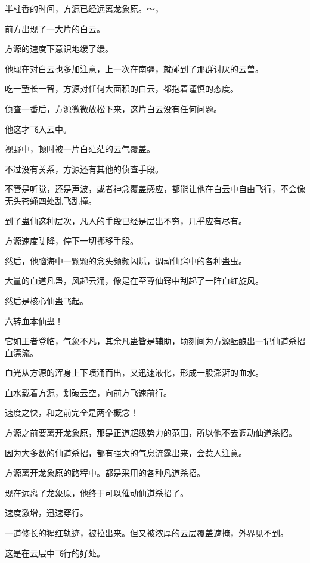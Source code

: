 
\begin{this_body}

半柱香的时间，方源已经远离龙象原。～，

前方出现了一大片的白云。

方源的速度下意识地缓了缓。

他现在对白云也多加注意，上一次在南疆，就碰到了那群讨厌的云兽。

吃一堑长一智，方源对任何大面积的白云，都抱着谨慎的态度。

侦查一番后，方源微微放松下来，这片白云没有任何问题。

他这才飞入云中。

视野中，顿时被一片白茫茫的云气覆盖。

不过没有关系，方源还有其他的侦查手段。

不管是听觉，还是声波，或者神念覆盖感应，都能让他在白云中自由飞行，不会像无头苍蝇四处乱飞乱撞。

到了蛊仙这种层次，凡人的手段已经是层出不穷，几乎应有尽有。

方源速度陡降，停下一切挪移手段。

然后，他脑海中一颗颗的念头频频闪烁，调动仙窍中的各种蛊虫。

大量的血道凡蛊，风起云涌，像是在至尊仙窍中刮起了一阵血红旋风。

然后是核心仙蛊飞起。

六转血本仙蛊！

它如王者登临，气象不凡，其余凡蛊皆是辅助，顷刻间为方源酝酿出一记仙道杀招血漂流。

血光从方源的浑身上下喷涌而出，又迅速液化，形成一股澎湃的血水。

血水载着方源，划破云空，向前方飞速前行。

速度之快，和之前完全是两个概念！

方源之前要离开龙象原，那是正道超级势力的范围，所以他不去调动仙道杀招。

因为大多数的仙道杀招，都有强大的气息流露出来，会惹人注意。

方源离开龙象原的路程中。都是采用的各种凡道杀招。

现在远离了龙象原，他终于可以催动仙道杀招了。

速度激增，迅速穿行。

一道修长的猩红轨迹，被拉出来。但又被浓厚的云层覆盖遮掩，外界见不到。

这是在云层中飞行的好处。


\end{this_body}
